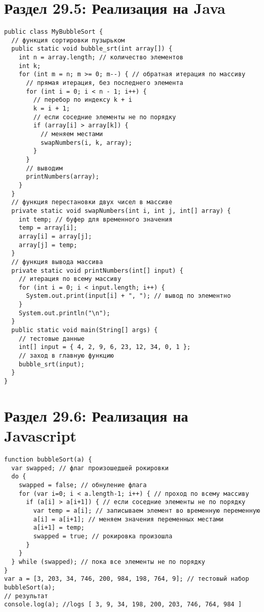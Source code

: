
\section*{Раздел 29.5: Реализация на Java}
\begin{tcolorbox}
\begin{verbatim}
public class MyBubbleSort {
  // функция сортировки пузырьком
  public static void bubble_srt(int array[]) {
    int n = array.length; // количество элементов
    int k;
    for (int m = n; m >= 0; m--) { // обратная итерация по массиву
      // прямая итерация, без последнего элемента
      for (int i = 0; i < n - 1; i++) {
        // перебор по индексу k + i
        k = i + 1;
        // если соседние элементы не по порядку
        if (array[i] > array[k]) {
          // меняем местами
          swapNumbers(i, k, array);
        }
      }
      // выводим
      printNumbers(array);
    }
  }
  // функция перестановки двух чисел в массиве
  private static void swapNumbers(int i, int j, int[] array) {
    int temp; // буфер для временного значения
    temp = array[i];
    array[i] = array[j];
    array[j] = temp;
  }
  // функция вывода массива
  private static void printNumbers(int[] input) {
    // итерация по всему массиву
    for (int i = 0; i < input.length; i++) {
      System.out.print(input[i] + ", "); // вывод по элементно
    }
    System.out.println("\n");
  }
  public static void main(String[] args) {
    // тестовые данные  
    int[] input = { 4, 2, 9, 6, 23, 12, 34, 0, 1 };
    // заход в главную функцию
    bubble_srt(input);
  }
}
\end{verbatim}
\end{tcolorbox}
\section*{Раздел 29.6: Реализация на Javascript}
\begin{tcolorbox}
\begin{verbatim}
function bubbleSort(a) {
  var swapped; // флаг произошедшей рокировки
  do {
    swapped = false; // обнуление флага
    for (var i=0; i < a.length-1; i++) { // проход по всему массиву
      if (a[i] > a[i+1]) { // если соседние элементы не по порядку
        var temp = a[i]; // записываем элемент во временную переменную
        a[i] = a[i+1]; // меняем значения переменных местами
        a[i+1] = temp;
        swapped = true; // рокировка произошла
      }
    }
  } while (swapped); // пока все элементы не по порядку
}
var a = [3, 203, 34, 746, 200, 984, 198, 764, 9]; // тестовый набор
bubbleSort(a);
// результат
console.log(a); //logs [ 3, 9, 34, 198, 200, 203, 746, 764, 984 ]
\end{verbatim}
\end{tcolorbox}
\newpage
